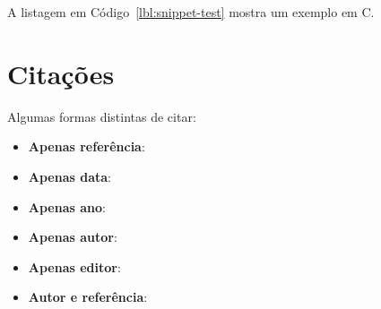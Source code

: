 A listagem em Código~\ref{lbl:snippet-test} mostra um exemplo em C.


 
 
 
 


\section{Citações}

Algumas formas distintas de citar:

\begin{itemize}
    \item \textbf{Apenas referência}:~\cite{rfc44}
    \item \textbf{Apenas data}:~
    \item \textbf{Apenas ano}:~\citeyear{rfc44}
    \item \textbf{Apenas autor}:~\citeauthor{rfc44}
    \item \textbf{Apenas editor}:
    \item \textbf{Autor e referência}:\citet{rfc44}
\end{itemize}
